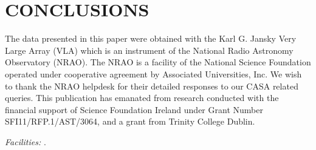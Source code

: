 \documentclass[iop]{emulateapj}
\begin{document}
\section{CONCLUSIONS}
 


\acknowledgments
The data presented in this paper were obtained with the Karl G. Jansky Very Large Array (VLA) which is an instrument of the National Radio Astronomy Observatory (NRAO). The NRAO is a facility of the National Science Foundation operated under cooperative agreement by Associated Universities, Inc. We wish to thank the NRAO helpdesk for their detailed responses to our CASA related queries. This publication has emanated from research conducted with the financial support of Science Foundation Ireland under Grant Number SFI11/RFP.1/AST/3064, and a grant from Trinity College Dublin.

{\it Facilities:} .




\end{document}
